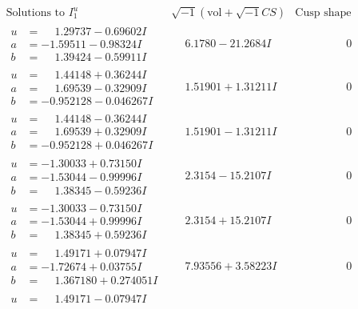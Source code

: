 \documentclass[1p]{elsarticle_modified}
\theoremstyle{definition}
\newcommand{\I}{\sqrt{-1}}
\begin{document}
$$\begin{array}{c|c|c}
\text{Solutions to }I^u_{1}& \I (\text{vol} + \sqrt{-1}CS) & \text{Cusp shape}\\
 \hline 
\begin{aligned}
u &= \phantom{-}1.29737 - 0.69602 I \\
a &= -1.59511 - 0.98324 I \\
b &= \phantom{-}1.39424 - 0.59911 I\end{aligned}
 & \phantom{-}6.1780 - 21.2684 I & \phantom{-0.000000 } 0 \\ \hline\begin{aligned}
u &= \phantom{-}1.44148 + 0.36244 I \\
a &= \phantom{-}1.69539 - 0.32909 I \\
b &= -0.952128 - 0.046267 I\end{aligned}
 & \phantom{-}1.51901 + 1.31211 I & \phantom{-0.000000 } 0 \\ \hline\begin{aligned}
u &= \phantom{-}1.44148 - 0.36244 I \\
a &= \phantom{-}1.69539 + 0.32909 I \\
b &= -0.952128 + 0.046267 I\end{aligned}
 & \phantom{-}1.51901 - 1.31211 I & \phantom{-0.000000 } 0 \\ \hline\begin{aligned}
u &= -1.30033 + 0.73150 I \\
a &= -1.53044 - 0.99996 I \\
b &= \phantom{-}1.38345 - 0.59236 I\end{aligned}
 & \phantom{-}2.3154 - 15.2107 I & \phantom{-0.000000 } 0 \\ \hline\begin{aligned}
u &= -1.30033 - 0.73150 I \\
a &= -1.53044 + 0.99996 I \\
b &= \phantom{-}1.38345 + 0.59236 I\end{aligned}
 & \phantom{-}2.3154 + 15.2107 I & \phantom{-0.000000 } 0 \\ \hline\begin{aligned}
u &= \phantom{-}1.49171 + 0.07947 I \\
a &= -1.72674 + 0.03755 I \\
b &= \phantom{-}1.367180 + 0.274051 I\end{aligned}
 & \phantom{-}7.93556 + 3.58223 I & \phantom{-0.000000 } 0 \\ \hline\begin{aligned}
u &= \phantom{-}1.49171 - 0.07947 I \\

\end{aligned}
\end{array}$$
\end{document}
